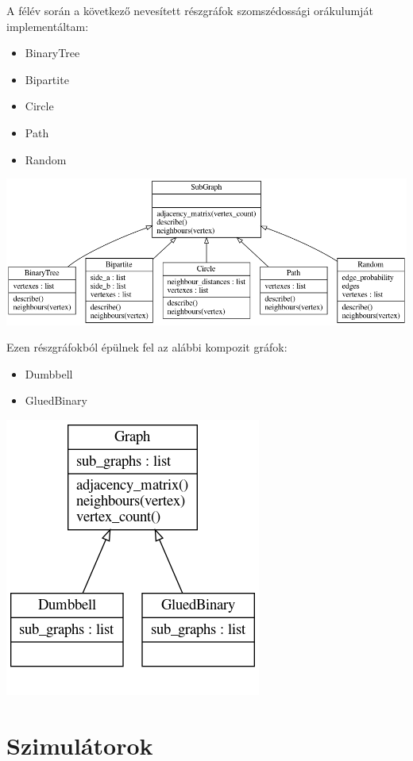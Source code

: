 A félév során a következő nevesített részgráfok szomszédossági orákulumját implementáltam:

\begin{itemize}
  \item BinaryTree
  \item Bipartite
  \item Circle
  \item Path
  \item Random
\end{itemize}


\begin{center}
  \includegraphics[width=\linewidth]{./figures/program/subgraph.png}
\end{center}

Ezen részgráfokból épülnek fel az alábbi kompozit gráfok:
\begin{itemize}
  \item Dumbbell
  \item GluedBinary
\end{itemize}

\begin{center}
  \includegraphics[width=0.4\linewidth]{./figures/program/graph.png}
\end{center}

\section{Szimulátorok}

